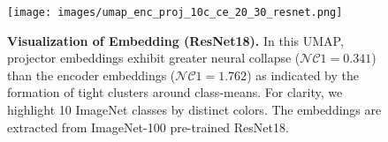 \begin{figure}[h]
    \centering
    \texttt{[image: images/umap\_enc\_proj\_10c\_ce\_20\_30\_resnet.png]}
  \caption{\textbf{Visualization of Embedding (ResNet18).} In this UMAP, projector embeddings exhibit greater neural collapse ($\mathcal{NC}1=0.341$) than the encoder embeddings ($\mathcal{NC}1=1.762$) as indicated by the formation of tight clusters around class-means. For clarity, we highlight 10 ImageNet classes by distinct colors. The embeddings are extracted from ImageNet-100 pre-trained ResNet18.} 
  \label{fig:umap_vis_resnet}
\end{figure}